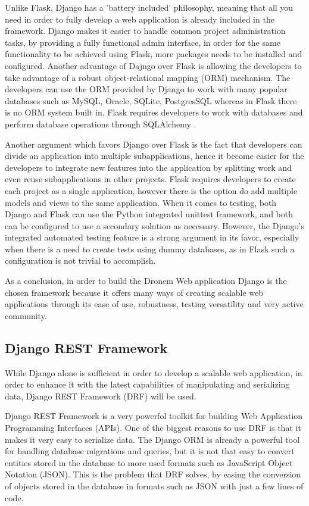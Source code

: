 \par Unlike Flask, Django has a 'battery included' philosophy, meaning that all you need in order to fully develop a web application is already included in the framework. Django makes it easier to handle common project administration tasks, by providing a fully functional admin interface, in order for the same functionality to be achieved using Flask, more packages needs to be installed and configured. Another advantage of Dajngo over Flask is allowing the developers to take advantage of a robust object-relational mapping (ORM) mechanism. The developers can use the ORM provided by Django to work with many popular databases such as MySQL, Oracle, SQLite, PostgresSQL whereas in Flask there is no ORM system built in. Flask requires developers to work with databases and perform database operations through SQLAlchemy \cite{sqlalchemy}.
\par Another argument which favors Django over Flask is the fact that developers can divide an application into multiple subapplications, hence it become easier for the developers to integrate new features into the application by splitting work and even reuse subapplications in other projects. Flask requires developers to create each project as a single application, however there is the option do add multiple models and views to the same application. When it comes to testing, both Django and Flask can use the Python integrated unittest framework, and both can be configured to use a secondary solution as necessary. However, the Django's integrated automated testing feature is a strong argument in its favor, especially when there is a need to create tests using dummy databases, as in Flask such a configuration is not trivial to accomplish.
\par As a conclusion, in order to build the Dronem Web application Django is the chosen framework because it offers many ways of creating scalable web applications through its ease of use, robustness, testing versatility and very active community.

\subsection{Django REST Framework}
While Django alone is sufficient in order to develop a scalable web application, in order to enhance it with the latest capabilities of manipulating and serializing data, Django REST Framework (DRF) will be used.
\par Django REST Framework \cite{drf} is a very powerfol toolkit for building Web Application Programming Interfaces (APIs). One of the biggest reasons to use DRF is that it makes it very easy to serialize data. The Django ORM is already a powerful tool for handling database migrations and queries, but it is not that easy to convert entities stored in the database to more used formats such as JavaScript Object Notation (JSON). This is the problem that DRF solves, by easing the conversion of objects stored in the database in formats such as JSON with just a few lines of code.

